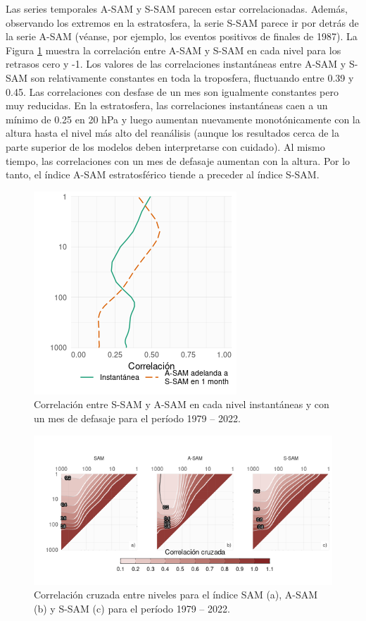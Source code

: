 \documentclass[12pt,oneside]{reedthesis}
\begin{document}
Las series temporales A-SAM y S-SAM parecen estar correlacionadas.
Además, observando los extremos en la estratosfera, la serie S-SAM parece ir por detrás de la serie A-SAM (véanse, por ejemplo, los eventos positivos de finales de 1987).
La Figura \ref{fig:cor-lev} muestra la correlación entre A-SAM y S-SAM en cada nivel para los retrasos cero y -1.
Los valores de las correlaciones instantáneas entre A-SAM y S-SAM son relativamente constantes en toda la troposfera, fluctuando entre 0.39 y 0.45.
Las correlaciones con desfase de un mes son igualmente constantes pero muy reducidas.
En la estratosfera, las correlaciones instantáneas caen a un mínimo de 0.25 en 20 hPa y luego aumentan nuevamente monotónicamente con la altura hasta el nivel más alto del reanálisis (aunque los resultados cerca de la parte superior de los modelos deben interpretarse con cuidado).
Al mismo tiempo, las correlaciones con un mes de defasaje aumentan con la altura.
Por lo tanto, el índice A-SAM estratosférico tiende a preceder al índice S-SAM.



\begin{figure}
\includegraphics{figures/30-sam/cor-lev-1} \caption{Correlación entre S-SAM y A-SAM en cada nivel instantáneas y con un mes de defasaje para el período 1979 -- 2022.}\label{fig:cor-lev}
\end{figure}



\begin{figure}
\includegraphics{figures/30-sam/cross-correlation-1} \caption{Correlación cruzada entre niveles para el índice SAM (a), A-SAM (b) y S-SAM (c) para el período 1979 -- 2022.}\label{fig:cross-correlation}
\end{figure}
\end{document}
